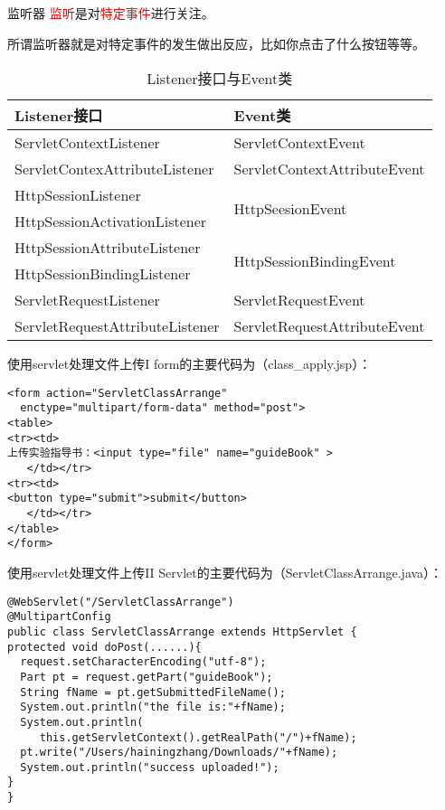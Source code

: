 \documentclass{beamer}
\begin{document}
\begin{frame}{监听器}
\textcolor{red}{监听}是对\textcolor{red}{特定事件}进行关注。

所谓监听器就是对特定事件的发生做出反应，比如你点击了什么按钮等等。
\begin{table}
\begin{tabular}{ll}
\toprule
\textbf{Listener接口}&\textbf{Event类}\\
\midrule
ServletContextListener&ServletContextEvent\\
ServletContexAttributeListener&ServletContextAttributeEvent\\
HttpSessionListener&\multirow{2}{*}{HttpSeesionEvent}\\
HttpSessionActivationListener&\\
HttpSessionAttributeListener&\multirow{2}{*}{HttpSessionBindingEvent}\\
HttpSessionBindingListener&\\
ServletRequestListener&ServletRequestEvent\\
ServletRequestAttributeListener&ServletRequestAttributeEvent\\
\bottomrule
\end{tabular}
\caption{Listener接口与Event类}
\end{table}
\end{frame}


\begin{frame}[fragile]{使用servlet处理文件上传I}
form的主要代码为（class\_apply.jsp）：
\begin{lstlisting}
<form action="ServletClassArrange" 
  enctype="multipart/form-data" method="post">
<table>
<tr><td>
上传实验指导书：<input type="file" name="guideBook" >
   </td></tr>
<tr><td>
<button type="submit">submit</button>
   </td></tr>
</table>
</form>
\end{lstlisting}
\end{frame}
\begin{frame}[fragile]{使用servlet处理文件上传II}
Servlet的主要代码为（ServletClassArrange.java）：
\begin{lstlisting}
@WebServlet("/ServletClassArrange")
@MultipartConfig
public class ServletClassArrange extends HttpServlet {
protected void doPost(......){
  request.setCharacterEncoding("utf-8");
  Part pt = request.getPart("guideBook");
  String fName = pt.getSubmittedFileName();
  System.out.println("the file is:"+fName);
  System.out.println(
     this.getServletContext().getRealPath("/")+fName);
  pt.write("/Users/hainingzhang/Downloads/"+fName);
  System.out.println("success uploaded!");
}
}
\end{lstlisting}
\end{frame}
\end{document}
